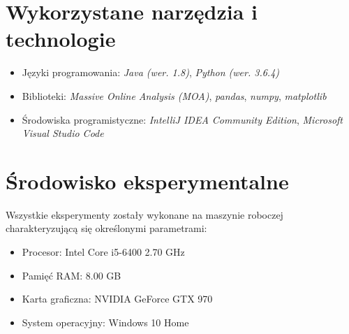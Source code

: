 \section{Wykorzystane narzędzia i technologie}

\begin{itemize}
    \item Języki programowania: \textit{Java (wer. 1.8)}, \textit{Python (wer. 3.6.4)}
    \item Biblioteki: \textit{Massive Online Analysis (MOA)}\cite{Article:MOA}, \textit{pandas}, \textit{numpy}, \textit{matplotlib}
    \item Środowiska programistyczne: \textit{IntelliJ IDEA Community Edition}, \textit{Microsoft Visual Studio Code}
\end{itemize}

\section{Środowisko eksperymentalne}

\noindent Wszystkie eksperymenty zostały wykonane na maszynie roboczej charakteryzującą się określonymi parametrami:

\begin{itemize}
    \item Procesor: Intel Core i5-6400 2.70 GHz
    \item Pamięć RAM: 8.00 GB
    \item Karta graficzna: NVIDIA GeForce GTX 970
    \item System operacyjny: Windows 10 Home
\end{itemize}